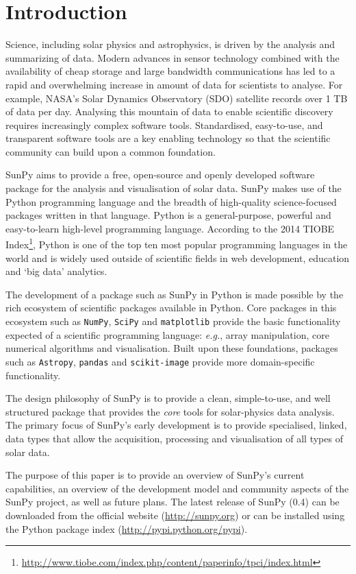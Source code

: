 \section{Introduction}
Science, including solar physics and astrophysics, is driven by the analysis 
and summarizing of data. Modern advances in sensor technology combined with 
the availability of cheap storage and large bandwidth communications has led to 
a rapid and overwhelming increase in amount of data for scientists to analyse.
For example, NASA's Solar 
Dynamics Observatory (SDO) satellite records over 1 TB of data per day. Analysing this 
mountain of data to enable scientific discovery requires increasingly complex software 
tools. Standardised, easy-to-use,
and transparent software tools are a key enabling technology
so that the scientific community can build upon a common foundation.

SunPy aims to provide a free, open-source and openly developed software package 
for the analysis and visualisation of solar data. SunPy makes use of the Python 
programming language and the breadth of high-quality science-focused packages 
written in that language. Python is a general-purpose, 
powerful and easy-to-learn high-level programming language.
According to the 
2014 TIOBE Index\footnote{\url{http://www.tiobe.com/index.php/content/paperinfo/tpci/index.html}},
 Python is one of the top ten most popular programming languages in the world 
and is widely used outside of scientific fields in web development, education 
and `big data' analytics.

The development of a package such as SunPy in Python is made possible by the 
rich ecosystem of scientific packages available in Python. Core packages in this 
ecosystem such as \texttt{NumPy}, \texttt{SciPy} and \texttt{matplotlib} 
provide the basic functionality expected of a scientific programming language: 
\textit{e.g.}, array manipulation, core numerical algorithms and visualisation. 
Built upon these foundations, packages such as \texttt{Astropy}, \texttt{pandas} and 
\texttt{scikit-image} provide more domain-specific functionality.

The design philosophy of SunPy is to provide a clean, simple-to-use, and well 
structured package that provides the \textit{core} tools for solar-physics data analysis. The 
primary focus of SunPy's early development is to provide specialised, linked, 
data types that allow the acquisition, processing and visualisation of all types 
of solar data.

The purpose of this paper is to provide an overview of SunPy's current 
capabilities, an overview of the development model and community aspects of the 
SunPy project, as well as future plans. The latest release of SunPy (0.4)
can be downloaded from
the official website (\url{http://sunpy.org}) or can be installed using 
the Python package index (\mbox{\url{http://pypi.python.org/pypi}}).
